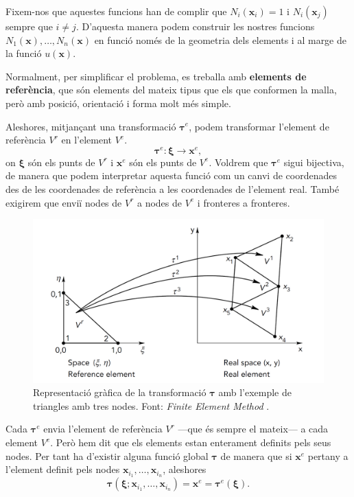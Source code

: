 \documentclass{article}
\begin{document}
Fixem-nos que aquestes funcions han de complir que $N_i(\boldsymbol{x}_i)=1$ i $N_i(\boldsymbol{x}_j)$ sempre que $i\neq j$. D'aquesta manera podem construir les nostres funcions $N_1(\boldsymbol{x}),\ldots,N_n(\boldsymbol{x})$ en funci\'{o} nom\'{e}s de la geometria dels elements i al marge de la funci\'{o} $u(\boldsymbol{x})$.
\vspace{5mm}

Normalment, per simplificar el problema, es treballa amb \textbf{elements de refer\`{e}ncia}, que s\'{o}n elements del mateix tipus que els que conformen la malla, per\`{o} amb posici\'{o}, orientaci\'{o} i forma molt m\'{e}s simple.

Aleshores, mitjan\c{c}ant una transformaci\'{o} $\boldsymbol{\tau}^e$, podem transformar l'element de refer\`{e}ncia $V^r$ en l'element $V^e$.
\[\boldsymbol{\tau}^e:\boldsymbol{\xi}\longrightarrow\boldsymbol{x}^e,\]
on $\boldsymbol{\xi}$ s\'{o}n els punts de $V^r$ i $\boldsymbol{x}^e$ s\'{o}n els punts de $V^e$. Voldrem que $\boldsymbol{\tau}^e$ sigui bijectiva, de manera que podem interpretar aquesta funci\'{o} com un canvi de coordenades des de les coordenades de refer\`{e}ncia a les coordenades de l'element real. Tamb\'{e} exigirem que envi\"{i} nodes de $V^r$ a nodes de $V^e$ i fronteres a fronteres.
\begin{figure}[ht!]
\begin{center}
\includegraphics[scale=0.25]{../grafics/elements/transformacio.pdf}
\caption{Representaci\'{o} gr\`{a}fica de la transformaci\'{o} $\boldsymbol{\tau}$ amb l'exemple de triangles amb tres nodes. Font: \emph{Finite Element Method} \cite{dhatt2012finite}.}
\label{Fig:Transformaciotau}
\end{center}
\end{figure}

Cada $\boldsymbol{\tau}^e$ envia l'element de refer\`{e}ncia $V^r$ ---que \'{e}s sempre el mateix--- a cada element $V^e$. Per\`{o} hem dit que els elements estan enterament definits pels seus nodes. Per tant ha d'existir alguna funci\'{o} global $\boldsymbol{\tau}$ de manera que si $\boldsymbol{x}^e$ pertany a l'element definit pels nodes $\boldsymbol{x}_{i_1},\ldots,\boldsymbol{x}_{i_n}$, aleshores
\[\boldsymbol{\tau}(\boldsymbol{\xi};\boldsymbol{x}_{i_1},\ldots,\boldsymbol{x}_{i_n})=\boldsymbol{x}^e=\boldsymbol{\tau}^e(\boldsymbol{\xi}).\]
\end{document}
